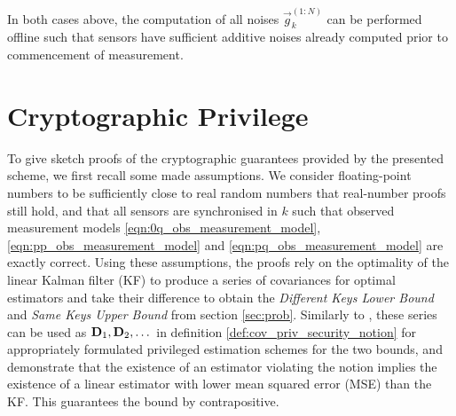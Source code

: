 \documentclass[conference]{IEEEtran}
\theoremstyle{definition}
\theoremstyle{remark}
\begin{document}
In both cases above, the computation of all noises $\vec{g}_k^{(1:N)}$ can be performed offline such that sensors have sufficient additive noises already computed prior to commencement of measurement.

% 
%                                                                   
%                                                                   
%                                                                   
% 

\section{Cryptographic Privilege}\label{sec:crypto}
To give sketch proofs of the cryptographic guarantees provided by the presented scheme, we first recall some made assumptions. We consider floating-point numbers to be sufficiently close to real random numbers that real-number proofs still hold, and that all sensors are synchronised in $k$ such that observed measurement models \eqref{eqn:0q_obs_measurement_model}, \eqref{eqn:pp_obs_measurement_model} and \eqref{eqn:pq_obs_measurement_model} are exactly correct. Using these assumptions, the proofs rely on the optimality of the linear Kalman filter (KF) \cite{haugBayesianEstimationTracking2012} to produce a series of covariances for optimal estimators and take their difference to obtain the \textit{Different Keys Lower Bound} and \textit{Same Keys Upper Bound} from section \ref{sec:prob}. Similarly to \cite{risticCryptographicallyPrivilegedState2022}, these series can be used as ${{\mathbf{D}}}_1,{{\mathbf{D}}}_2,\dots$ in definition \ref{def:cov_priv_security_notion} for appropriately formulated privileged estimation schemes for the two bounds, and demonstrate that the existence of an estimator violating the notion implies the existence of a linear estimator with lower mean squared error (MSE) than the KF. This guarantees the bound by contrapositive.

% 
% 
\end{document}
